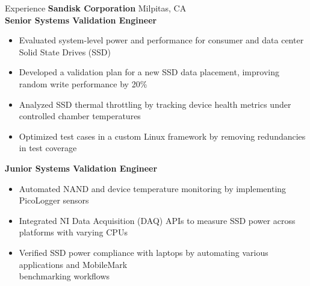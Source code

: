 \documentclass{resume} %
\begin{document}
\begin{rSection}{\large Experience}
\textbf{\large Sandisk Corporation} \vspace{3mm} \hfill Milpitas, CA\\\hspace*{0mm}\textbf{Senior Systems Validation Engineer}  \hfill {}
 \begin{itemize}[left=0em]
 \itemsep -0.5em \vspace{-0.5em}
     \item {} Evaluated system-level power and performance for consumer and data center Solid State Drives (SSD)
   \item Developed a validation plan for a new SSD data placement, improving random write
performance by 20\%
     \item Analyzed SSD thermal throttling by tracking device health metrics under controlled chamber                   
temperatures
     \item Optimized test cases in a custom Linux framework by removing redundancies in test coverage

 \end{itemize}
\vspace{2mm}
\hspace*{0mm}\textbf{Junior Systems Validation Engineer}  \hfill {}
 \begin{itemize}[left=0em]
 \itemsep -0.5em \vspace{-0.5em}
    \item Automated NAND and device temperature monitoring by implementing PicoLogger sensors
    \item Integrated NI Data Acquisition (DAQ) APIs to measure SSD power across platforms with varying CPUs
    \item Verified SSD power compliance with laptops by automating various applications and 
MobileMark\\ benchmarking workflows
 \end{itemize}



\end{rSection} 
\end{document}
